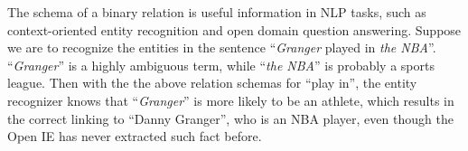 
The schema of a binary relation is useful information in NLP tasks,
such as context-oriented entity recognition and open domain question answering.
Suppose we are to recognize the entities in the sentence
``\textit{Granger} played in \textit{the NBA}''.
``\textit{Granger}'' is a highly ambiguous term, while ``\textit{the NBA}''
is probably a sports league. Then with the the above relation schemas for
``play in'', the entity recognizer knows that ``\textit{Granger}''
is more likely to be an athlete, which results in the correct linking to
``Danny Granger'', who is an NBA player, even though the Open IE
has never extracted such fact before.


%
%

